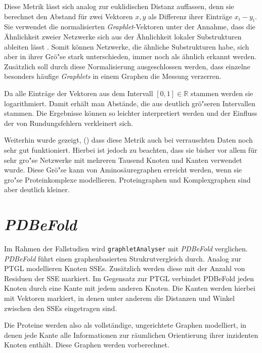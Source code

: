\documentclass{report}
\begin{document}
Diese Metrik l\"asst sich analog zur euklidischen Distanz auffassen, denn sie berechnet den Abstand f\"ur zwei Vektoren $x,y$ als Differenz ihrer Eintr\"age $x_i -y_i$. Sie verwendet die normalisierten \textit{Graphlet}-Vektoren unter der Annahme, dass die \"Ahnlichkeit zweier Netzwerke sich aus der \"Ahnlichkeit lokaler Substrukturen ableiten l\"asst \cite{frqdistribution}. Somit k\"onnen Netzwerke, die \"ahnliche Substrukturen habe, sich aber in ihrer Gr\"o"se stark unterschieden, immer noch als \"ahnlich erkannt werden. Zus\"atzlich soll durch diese Normalisierung ausgeschlossen werden, dass einzelne besonders h\"aufige \textit{Graphlets} in einem Graphen die Messung verzerren.

Da alle Eintr\"age der Vektoren aus dem Intervall $ [0,1] \in \mathbb{R} $ stammen werden sie logarithmiert. Damit erh\"alt man Abst\"ande, die aus deutlich gr\"o"seren Intervallen stammen. Die Ergebnisse k\"onnen so leichter interpretiert werden und der Einfluss der von Rundungsfehlern verkleinert sich.
 
Weiterhin wurde gezeigt, (\cite{frqdistribution}) dass diese Metrik auch bei verrauschten Daten noch sehr gut funktioniert. Hierbei ist jedoch zu beachten, dass sie bisher vor allem f\"ur sehr gro"se Netzwerke mit mehreren Tausend Knoten und Kanten verwendet wurde. Diese Gr\"o"se kann von Aminos\"auregraphen erreicht werden, wenn sie gro"se Proteinkomplexe modellieren. Proteingraphen und Komplexgraphen sind aber deutlich kleiner.

\section{\textit{PDBeFold}}

Im Rahmen der Fallstudien wird \texttt{graphletAnalyser} mit \textit{PDBeFold} \cite{pdbefold} verglichen. \textit{PDBeFold} f\"uhrt einen graphenbasierten Strukrutvergleich durch. Analog zur PTGL modellieren Knoten SSEs. Zus\"atzlich werden diese mit der Anzahl von Residuen der SSE markiert. Im Gegensatz zur PTGL verbindet PDBeFold jeden Knoten durch eine Kante mit jedem anderen Knoten. Die Kanten werden hierbei mit Vektoren markiert, in denen unter anderem die Distanzen und Winkel zwischen den SSEs eingetragen sind.

Die Proteine werden also als vollst\"andige, ungerichtete Graphen modelliert, in denen jede Kante alle Informationen zur r\"aumlichen Orientierung ihrer inzidenten Knoten enth\"alt. Diese Graphen werden vorberechnet.
\end{document}
